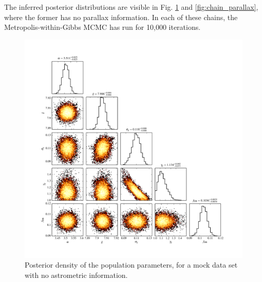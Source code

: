 \documentclass[fleqn,usenatbib]{mnras}
\begin{document}
The inferred posterior distributions are visible in Fig. \ref{fig:chain} and \ref{fig:chain_parallax}, where the former has no parallax information. In each of these chains, the Metropolis-within-Gibbs MCMC has run for 10,000 iterations.

\begin{figure}
	\includegraphics[width=1.\textwidth]{toy_chain.pdf}
    \caption{Posterior density of the population parameters, for a mock data set with no astrometric information.}
    \label{fig:chain}
\end{figure}
\end{document}
